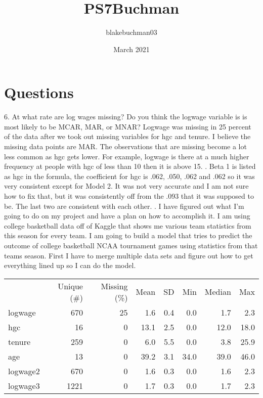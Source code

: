 \documentclass{article}
\title{PS7Buchman}
\author{blakebuchman03 }
\date{March 2021}
\begin{document}
\maketitle

\section{Questions}
6. At what rate are log wages missing? Do you think the logwage variable is is most likely to be MCAR, MAR, or MNAR?
\newline Logwage was missing in 25 percent of the data after we took out missing variables for hgc and tenure. I believe the missing data points are MAR. The observations that are missing become a lot less common as hgc gets lower. For example, logwage is there at a much higher frequency at people with hgc of less than 10 then it is above 15.
\newline
{}. Beta 1 is listed as hgc in the formula, the coefficient for hgc is .062, .050, .062 and .062 so it was very consistent except for Model 2. It was not very accurate and I am not sure how to fix that, but it was consistently off from the .093 that it was supposed to be. The last two are consistent with each other. 
\newline
{}. I have figured out what I'm going to do on my project and have a plan on how to accomplish it. I am using college basketball data off of Kaggle that shows me various team statistics from this season for every team. I am going to build a model that tries to predict the outcome of college basketball NCAA tournament games using statistics from that teams season. First I have to merge multiple data sets and figure out how to get everything lined up so I can do the model. 
\begin{table}
\centering
\begin{tabular}[t]{lrrrrrrr}

  & Unique (\#) & Missing (\%) & Mean & SD & Min & Median & Max\\

logwage & 670 & 25 & 1.6 & 0.4 & 0.0 & 1.7 & 2.3\\
hgc & 16 & 0 & 13.1 & 2.5 & 0.0 & 12.0 & 18.0\\
tenure & 259 & 0 & 6.0 & 5.5 & 0.0 & 3.8 & 25.9\\
age & 13 & 0 & 39.2 & 3.1 & 34.0 & 39.0 & 46.0\\
logwage2 & 670 & 0 & 1.6 & 0.3 & 0.0 & 1.6 & 2.3\\
logwage3 & 1221 & 0 & 1.7 & 0.3 & 0.0 & 1.7 & 2.3\\

\end{tabular}
\end{table}
\end{document}
